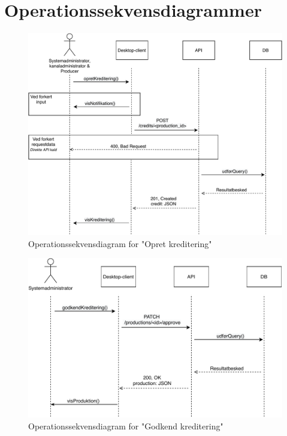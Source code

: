 \section{Operationssekvensdiagrammer}

\begin{figure}[ht]
\centering
\includegraphics[scale=0.7]{figures/Operationssekvensdiagrammer/opretKreditering.pdf}
\caption{Operationssekvensdiagram for "Opret kreditering"}
\label{fig:op_create_credit}
\end{figure}

\begin{figure}[hb]
\centering
\includegraphics[scale=0.7]{figures/Operationssekvensdiagrammer/godkendKrediteringSysAdm.pdf}
\caption{Operationssekvensdiagram for "Godkend kreditering"}
\label{fig:op_approve_credit}
\end{figure}

